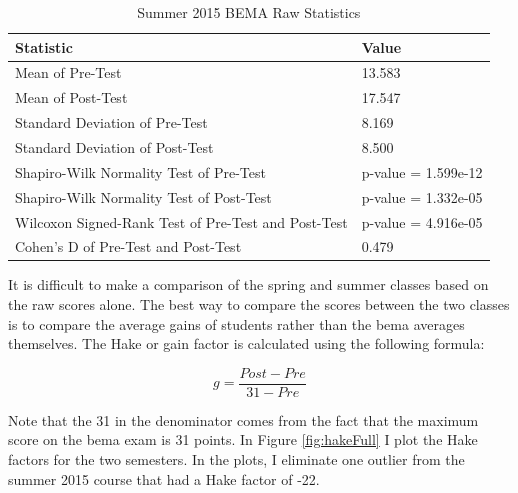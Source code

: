 \begin{small}
\begin{table}
  \centering
  \begin{tabular}{|l|l|}
    \hline
    \textbf{Statistic} & \textbf{Value} \\
	\hline
	Mean of Pre-Test & 13.583 \\
	\hline
	Mean of Post-Test & 17.547 \\
	\hline
	Standard Deviation of Pre-Test & 8.169 \\
	\hline
	Standard Deviation of Post-Test & 8.500 \\
	\hline
	Shapiro-Wilk Normality Test of Pre-Test & p-value = 1.599e-12 \\
	\hline
	Shapiro-Wilk Normality Test of Post-Test & p-value = 1.332e-05 \\
	\hline
	Wilcoxon Signed-Rank Test of Pre-Test and Post-Test & p-value = 4.916e-05 \\
	\hline
	Cohen's D of Pre-Test and Post-Test & 0.479 \\
	\hline
  \end{tabular}
  \caption{Summer 2015 BEMA Raw Statistics}
  \label{tab:statsSu15}
\end{table}
\end{small}

It is difficult to make a comparison of the spring and summer classes based on the raw scores alone. The best way to compare the scores between the two classes is to compare the average gains of students rather than the \gls{bema} averages themselves. The Hake or gain factor is calculated using the following formula:

\begin{equation}
	g = \frac{Post - Pre}{31 - Pre}
\end{equation}

Note that the 31 in the denominator comes from the fact that the maximum score on the \gls{bema} exam is 31 points. In Figure \ref{fig:hakeFull} I plot the Hake factors for the two semesters. In the plots, I eliminate one outlier from the summer 2015 course that had a Hake factor of -22.

